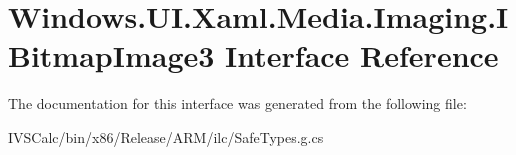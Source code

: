 \hypertarget{interface_windows_1_1_u_i_1_1_xaml_1_1_media_1_1_imaging_1_1_i_bitmap_image3}{}\section{Windows.\+U\+I.\+Xaml.\+Media.\+Imaging.\+I\+Bitmap\+Image3 Interface Reference}
\label{interface_windows_1_1_u_i_1_1_xaml_1_1_media_1_1_imaging_1_1_i_bitmap_image3}


The documentation for this interface was generated from the following file\+:\begin{DoxyCompactItemize}
\item 
I\+V\+S\+Calc/bin/x86/\+Release/\+A\+R\+M/ilc/Safe\+Types.\+g.\+cs\end{DoxyCompactItemize}
